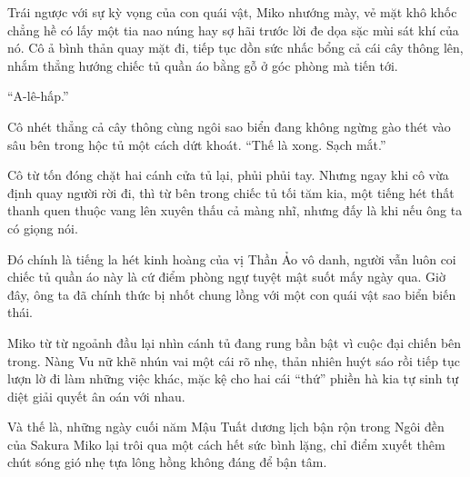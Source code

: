 \documentclass[../main.tex]{subfiles}
\begin{document}
Trái ngược với sự kỳ vọng của con quái vật, Miko nhướng mày, vẻ mặt khô khốc chẳng hề có lấy một tia nao núng hay sợ hãi trước lời đe dọa sặc mùi sát khí của nó. Cô ả bình thản quay mặt đi, tiếp tục dồn sức nhấc bổng cả cái cây thông lên, nhắm thẳng hướng chiếc tủ quần áo bằng gỗ ở góc phòng mà tiến tới.

``A-lê-hấp.''

Cô nhét thẳng cả cây thông cùng ngôi sao biển đang không ngừng gào thét vào sâu bên trong hộc tủ một cách dứt khoát. ``Thế là xong. Sạch mắt.''

Cô từ tốn đóng chặt hai cánh cửa tủ lại, phủi phủi tay. Nhưng ngay khi cô vừa định quay người rời đi, thì từ bên trong chiếc tủ tối tăm kia, một tiếng hét thất thanh quen thuộc vang lên xuyên thấu cả màng nhĩ, nhưng đấy là khi nếu ông ta có giọng nói.



Đó chính là tiếng la hét kinh hoàng của vị Thần Ảo vô danh, người vẫn luôn coi chiếc tủ quần áo này là cứ điểm phòng ngự tuyệt mật suốt mấy ngày qua. Giờ đây, ông ta đã chính thức bị nhốt chung lồng với một con quái vật sao biển biến thái.

Miko từ từ ngoảnh đầu lại nhìn cánh tủ đang rung bần bật vì cuộc đại chiến bên trong. Nàng Vu nữ khẽ nhún vai một cái rõ nhẹ, thản nhiên huýt sáo rồi tiếp tục lượn lờ đi làm những việc khác, mặc kệ cho hai cái ``thứ'' phiền hà kia tự sinh tự diệt giải quyết ân oán với nhau.

Và thế là, những ngày cuối năm Mậu Tuất dương lịch bận rộn trong Ngôi đền của Sakura Miko lại trôi qua một cách hết sức bình lặng, chỉ điểm xuyết thêm chút sóng gió nhẹ tựa lông hồng không đáng để bận tâm.
\end{document}
